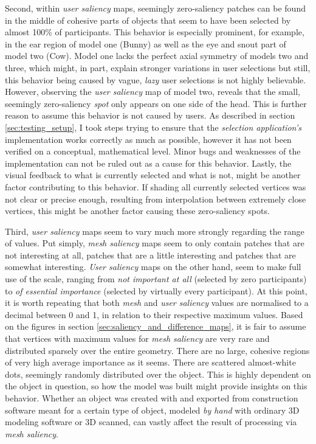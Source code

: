 Second, within \textit{user saliency} maps, seemingly zero-saliency patches can be found in the middle of cohesive parts of objects that seem to have been selected by almost 100\% of participants. This behavior is especially prominent, for example, in the ear region of model one (Bunny) as well as the eye and snout part of model two (Cow). Model one lacks the perfect axial symmetry of models two and three, which might, in part, explain stronger variations in user selections but still, this behavior being caused by vague, \textit{lazy} user selections is not highly believable. However, observing the \textit{user saliency} map of model two, reveals that the small, seemingly zero-saliency \textit{spot} only appears on one side of the head. This is further reason to assume this behavior is not caused by users. As described in section \ref{sec:testing_setup}, I took steps trying to ensure that the \textit{selection application's} implementation works correctly as much as possible, however it has not been verified on a conceptual, mathematical level. Minor bugs and weaknesses of the implementation can not be ruled out as a cause for this behavior. Lastly, the visual feedback to what is currently selected and what is not, might be another factor contributing to this behavior. If shading all currently selected vertices was not clear or precise enough, resulting from interpolation between extremely close vertices, this might be another factor causing these zero-saliency spots.

Third, \textit{user saliency} maps seem to vary much more strongly regarding the range of values. Put simply, \textit{mesh saliency} maps seem to only contain patches that are not interesting at all, patches that are a little interesting and patches that are somewhat interesting. \textit{User saliency} maps on the other hand, seem to make full use of the scale, ranging from \textit{not important at all} (selected by zero participants) to \textit{of essential importance} (selected by virtually every participant). At this point, it is worth repeating that both \textit{mesh} and \textit{user saliency} values are normalised to a decimal between 0 and 1, in relation to their respective maximum values. Based on the figures in section \ref{sec:saliency_and_difference_maps}, it is fair to assume that vertices with maximum values for \textit{mesh saliency} are very rare and distributed sparsely over the entire geometry. There are no large, cohesive regions of very high average importance as it seems. There are scattered almost-white dots, seemingly randomly distributed over the object. This is highly dependent on the object in question, so how the model was built might provide insights on this behavior. Whether an object was created with and exported from construction software meant for a certain type of object, modeled \textit{by hand} with ordinary 3D modeling software or 3D scanned, can vastly affect the result of processing via \textit{mesh saliency}.

